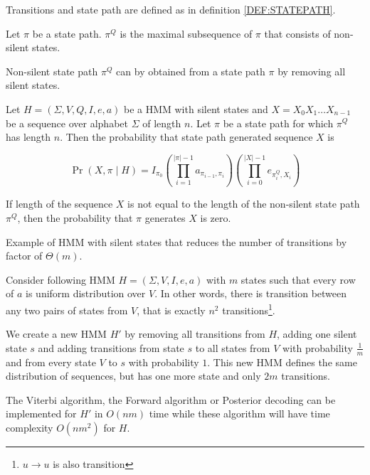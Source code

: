 \begin{definition}
Transitions and state path are defined as in definition \ref{DEF:STATEPATH}. 

Let $\pi$ be a state path.  $\pi^Q$ is
the maximal subsequence of $\pi$ that consists of non-silent states.
\end{definition}

\begin{note}
Non-silent state path $\pi^Q$ can by obtained from a state path $\pi$ by removing all silent
states.
\end{note}

\begin{definition}
Let $H=(\Sigma,V,Q,I,e,a)$ be a HMM with silent states and $X=X_0X_1\dots
X_{n-1}$ be a sequence over
alphabet $\Sigma$ of length $n$. Let $\pi$ be a state path for which $\pi^Q$ has
length $n$. Then the probability that state path generated sequence $X$ is 

\[\Pr\left(X,\pi\mid H\right) =
I_{\pi_0}\left(\prod_{i=1}^{|\pi|-1}a_{\pi_{i-1},\pi_i}\right)\left(\prod_{i=0}^{|X|-1}e_{\pi^Q_i,X_i}\right)\]

If length of the sequence $X$ is not equal to the length of the non-silent state
path $\pi^Q$, then the
probability that $\pi$ generates $X$ is zero.
\end{definition}

\begin{example}
Example of HMM with silent states that reduces the number of transitions by factor
of $\Theta(m)$.

Consider following HMM $H=(\Sigma,V,I,e,a)$ with $m$ states such that every row
of $a$ is uniform distribution over $V$. In other words, there is transition
between any two pairs of states from $V$, that is exactly $n^2$
transitions\footnote{$u\to u$ is also transition}.

We create a new HMM $H'$ by removing all transitions from $H$, adding one silent
state $s$ and adding transitions
from state $s$ to all states from $V$ with probability $\frac1m$  and from every
state $V$ to $s$ with probability $1$. This new HMM
defines the same distribution of sequences, but has one more state and only $2m$
transitions. 

The Viterbi algorithm, the Forward algorithm or Posterior decoding can be
implemented for $H'$ in $O(nm)$ time while these algorithm will have time
complexity $O(nm^2)$ for $H$.
\end{example}

